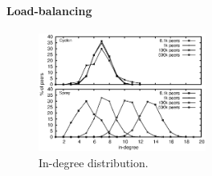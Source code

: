 \paragraph{Load-balancing}

\begin{figure}
  \centering
  \includegraphics[width=0.49\textwidth]{img/histo.eps}
  \caption{\label{fig:histo}In-degree distribution.}
\end{figure}


